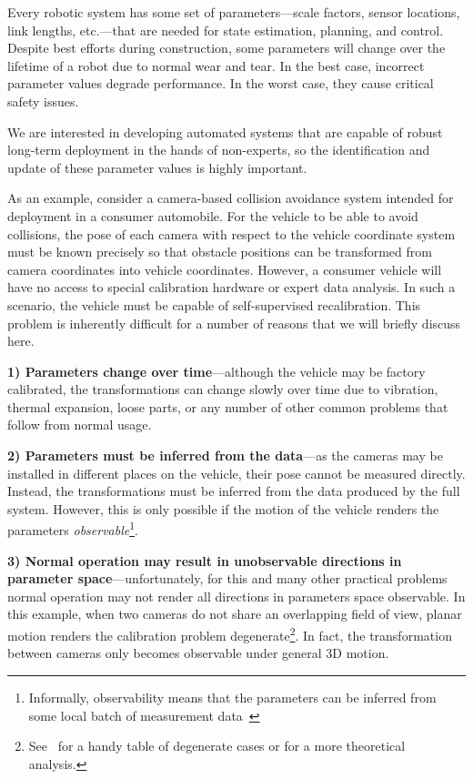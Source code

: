 Every robotic system has some set of parameters---scale factors, sensor
locations, link lengths, etc.---that are needed for state estimation, planning,
and control. Despite best efforts during construction, some parameters will
change over the lifetime of a robot due to normal wear and tear. In the best
case, incorrect parameter values degrade performance. In the worst case, they
cause critical safety issues.

We are interested in developing automated systems that are capable of robust
long-term deployment in the hands of non-experts, so the identification and
update of these parameter values is highly important.

As an example, consider a camera-based collision avoidance system intended for
deployment in a consumer automobile. For the vehicle to be able to avoid
collisions, the pose of each camera with respect to the vehicle coordinate
system must be known precisely so that obstacle positions can be transformed
from camera coordinates into vehicle coordinates. However, a consumer vehicle
will have no access to special calibration hardware or expert data analysis.
In such a scenario, the vehicle must be capable of self-supervised
recalibration. This problem is inherently difficult for a number of reasons that
we will briefly discuss here.

{\bf 1) Parameters change over time}---although the vehicle may be factory
calibrated, the transformations can change slowly over time due to vibration,
thermal expansion, loose parts, or any number of other common problems that
follow from normal usage.

{\bf 2) Parameters must be inferred from the data}---as the cameras may be
installed in different places on the vehicle, their pose cannot be measured
directly. Instead, the transformations must be inferred from the data produced
by the full system. However, this is only possible if the motion of the vehicle
renders the parameters {\em observable}\footnote{Informally, observability
means that the parameters can be inferred from some local batch of measurement
data~\cite{jazwinski70stochastic}}.

{\bf 3) Normal operation may result in unobservable directions in parameter
space}---unfortunately, for this and many other practical problems normal
operation may not render all directions in parameters space observable. In this
example, when two cameras do not share an overlapping field of view, planar
motion renders the calibration problem
degenerate\footnote{See~\cite{lebraly10calibration} for a handy table of
degenerate cases or \cite{kim06absolute} for a more theoretical analysis.}.
In fact, the transformation between cameras only becomes observable under
general 3D motion.

